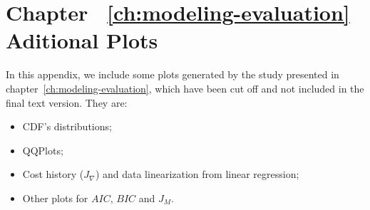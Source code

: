 \chapter{Chapter ~\ref{ch:modeling-evaluation} Aditional Plots}
\label{ap:aditional-plots}


In this appendix, we include some plots generated by the study presented in chapter~\ref{ch:modeling-evaluation}, which have been cut off and not included in the final text version. They are:

\begin{itemize}
	
	\item CDF's distributions;
	
	\item QQPlots;
	
	\item Cost history ($J_\nabla$) and data linearization from linear regression;
	
	\item Other plots for $AIC$, $BIC$ and $J_M$.
	
\end{itemize}

\clearpage

